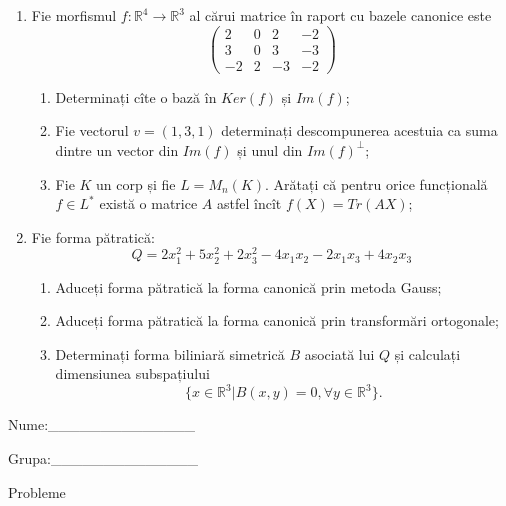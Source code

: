 \documentclass{article}
\begin{document}
\begin{enumerate}
 \item Fie morfismul $f:\mathbb{R}^4 \to \mathbb{R}^3$ al cărui matrice în raport cu bazele canonice este
$$\begin{pmatrix}
2&0&2&-2\\
3&0&3&-3\\
-2&2&-3&-2
\end{pmatrix}$$

\begin{enumerate}
\item Determinați cîte o bază în $Ker(f)$ și $Im(f)$;
\item Fie vectorul $v=(1,3,1)$ determinați descompunerea acestuia ca suma dintre un vector din $Im(f)$ și unul din $Im(f)^\perp$;
\item Fie $K$ un corp și fie $L=M_n(K)$. Arătați că pentru orice funcțională $f \in L^*$ există o matrice $A$ astfel încît $f(X)=Tr(AX)$;
\end{enumerate}
\item Fie forma pătratică:
$$Q= 2x_1^2+5x_2^2+2x_3^2-4x_1x_2-2x_1x_3+4x_2x_3$$

\begin{enumerate}
\item Aduceți forma pătratică la forma canonică prin metoda Gauss;
\item Aduceți forma pătratică la forma canonică prin transformări ortogonale;
\item Determinați forma biliniară simetrică $B$ asociată lui $Q$ și calculați dimensiunea subspațiului
$$\{x \in \mathbb{R}^3 | B(x,y)=0,\forall y \in \mathbb{R}^3\}.$$

\end{enumerate}
\end{enumerate}
\newpage
\begin{flushright}
Nume:\_\_\_\_\_\_\_\_\_\_\_\_\_\_
 
 
Grupa:\_\_\_\_\_\_\_\_\_\_\_\_\_\_
\end{flushright}
\begin{center}
\vspace{2cm}
{\Large Probleme}
\vspace{2cm}
\end{center}
\end{document}
